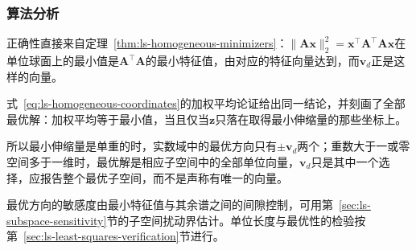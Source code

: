 \subsubsection{算法分析}
正确性直接来自定理~\ref{thm:ls-homogeneous-minimizers}：$\lVert\bm A\bm x\rVert_2^2=\bm x^\top\bm A^\top\bm A\bm x$在单位球面上的最小值是$\bm A^\top\bm A$的最小特征值，由对应的特征向量达到，而$\bm v_d$正是这样的向量。

式~\eqref{eq:ls-homogeneous-coordinates}的加权平均论证给出同一结论，并刻画了全部最优解：加权平均等于最小值，当且仅当$\bm z$只落在取得最小伸缩量的那些坐标上。

所以最小伸缩量是单重的时，实数域中的最优方向只有$\pm\bm v_d$两个；重数大于一或零空间多于一维时，最优解是相应子空间中的全部单位向量，$\bm v_d$只是其中一个选择，应报告整个最优子空间，而不是声称有唯一的向量。

最优方向的敏感度由最小特征值与其余谱之间的间隙控制，可用第~\ref{sec:ls-subspace-sensitivity}节的子空间扰动界估计。单位长度与最优性的检验按第~\ref{sec:ls-least-squares-verification}节进行。
